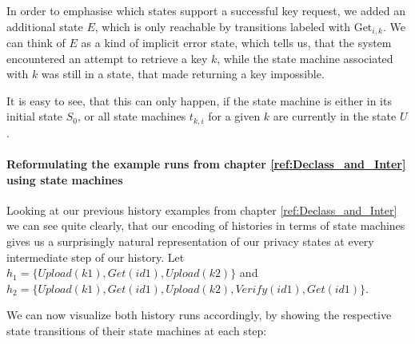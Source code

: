 In order to emphasise which states support a successful key request, we added an additional state \(E\), which is only reachable by transitions labeled with \(\text{Get}_{i,k}\). We can think of \(E\) as a kind of implicit error state, which tells us, that the system encountered an attempt to retrieve a key \(k\), while the state machine associated with \(k\) was still in a state, that made returning a key impossible. 

It is easy to see, that this can only happen, if the state machine is either in its initial state \(S_0\), or all state machines \(t_{k,i}\) for a given \(k\) are currently in the state \(U\).
\\
\paragraph{Reformulating the example runs from chapter \ref{ref:Declass_and_Inter} using state machines}
Looking at our previous history examples from chapter \ref{ref:Declass_and_Inter} we can see quite clearly, that our encoding of histories in terms of state machines gives us a surprisingly natural representation of our privacy states at every intermediate step of our history.
Let \(h_1=\{Upload(k1),Get(id1),Upload(k2)\}\) and \(h_2 = \{Upload(k1),Get(id1),Upload(k2),Verify(id1),Get(id1)\}\).

We can now visualize both history runs accordingly, by showing the respective state transitions of their state machines at each step:

